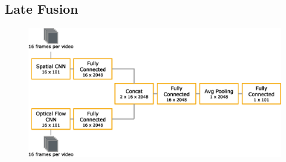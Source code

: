 \subsection{Late Fusion}


\begin{figure}[!htb]
	\centering
	\includegraphics[scale=.7]{images/late_fusion.eps}
	\caption{}
	\label{fig:late_fusion}
\end{figure}




